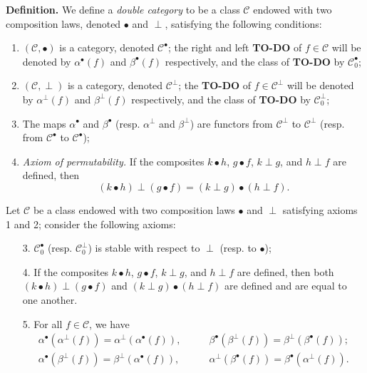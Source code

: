 \documentclass{article}
\newenvironment{rmenv}[1]
  {\phantomsection\par\medskip\noindent\textbf{#1.}\rmfamily}
  {\par\medskip}
\newcommand{\todo}{{\color{purple}\textbf{TO-DO }}}
\newcommand{\CC}{\mathcal{C}}
\begin{document}
\begin{rmenv}{Definition}
  We define a \emph{double category} to be a class $\CC$ endowed with two composition laws, denoted $\bullet$ and $\perp$, satisfying the following conditions:

  \begin{enumerate}
    \item $(\CC,\bullet)$ is a category, denoted $\CC^\bullet$;
      the right and left \todo of $f\in\CC$ will be denoted by $\alpha^\bullet(f)$ and $\beta^\bullet(f)$ respectively, and the class of \todo by $\CC_0^\bullet$;
    \item $(\CC,\perp)$ is a category, denoted $\CC^\perp$;
      the \todo of $f\in\CC^\perp$ will be denoted by $\alpha^\perp(f)$ and $\beta^\perp(f)$ respectively, and the class of \todo by $\CC_0^\perp$;
    \item The maps $\alpha^\bullet$ and $\beta^\bullet$ (resp. $\alpha^\perp$ and $\beta^\perp$) are functors from $\CC^\perp$ to $\CC^\perp$ (resp. from $\CC^\bullet$ to $\CC^\bullet$);
    \item \emph{Axiom of permutability.}
      If the composites $k\bullet h$, $g\bullet f$, $k\perp g$, and $h\perp f$ are defined, then
      \[
        (k\bullet h)\perp(g\bullet f)
        = (k\perp g)\bullet(h\perp f).
      \]
  \end{enumerate}

  Let $\CC$ be a class endowed with two composition laws $\bullet$ and $\perp$ satisfying axioms 1 and 2; consider the following axioms:

  \begin{enumerate}
    \item[3\textquotesingle.]
      $\CC_0^\bullet$ (resp. $\CC_0^\perp$) is stable with respect to $\perp$ (resp. to $\bullet$);
    \item[4\textquotesingle.]
      If the composites $k\bullet h$, $g\bullet f$, $k\perp g$, and $h\perp f$ are defined, then both $(k\bullet h)\perp(g\bullet f)$ and $(k\perp g)\bullet(h\perp f)$ are defined and are equal to one another.
    \item[5.]
      For all $f\in\CC$, we have
      \[
        \begin{aligned}
          \alpha^\bullet(\alpha^\perp(f))
          = \alpha^\perp(\alpha^\bullet(f)),
          &\qquad
          \beta^\bullet(\beta^\perp(f))
          = \beta^\perp(\beta^\bullet(f));
        \\\alpha^\bullet(\beta^\perp(f))
          = \beta^\perp(\alpha^\bullet(f)),
          &\qquad
          \alpha^\perp(\beta^\bullet(f))
          = \beta^\bullet(\alpha^\perp(f)).
        \end{aligned}
      \]
  \end{enumerate}
\end{rmenv}
\end{document}

